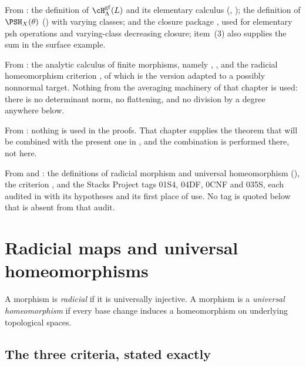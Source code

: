From : the definition of
$\cH^{\mathrm{gf}}_\Lambda(L)$ and its elementary calculus
(, ); the definition
of $\PSH_X(\theta)$ () with varying classes; and the
closure package , used for elementary psh operations and varying-class decreasing
closure; item~(3) also supplies the sum in the surface example.

From : the analytic calculus of finite
morphisms, namely ,
, and the radicial homeomorphism
criterion , of which
 is the version adapted to a
possibly nonnormal target.  Nothing from the averaging machinery of that
chapter is used: there is no determinant norm, no flattening, and no
division by a degree anywhere below.

From : nothing is used in the proofs.  That
chapter supplies the theorem that will be combined with the present one in
, and the combination is performed
there, not here.

From  and : the definitions of
radicial morphism and universal homeomorphism
(), the criterion
, and the Stacks Project
tags 01S4, 04DF, 0CNF and 035S, each audited in
 with its hypotheses and its first
place of use.  No tag is quoted below that is absent from that audit.

\section{Radicial maps and universal homeomorphisms}
\label{sec:ch43-radicial}

\begin{definition}
\label{def:bj-universal-homeomorphism}
A morphism is \emph{radicial} if it is universally injective.
A morphism is a \emph{universal homeomorphism} if every base change induces a
homeomorphism on underlying topological spaces.
\end{definition}

\subsection{The three criteria, stated exactly}
\label{sec:ch43-criteria}

